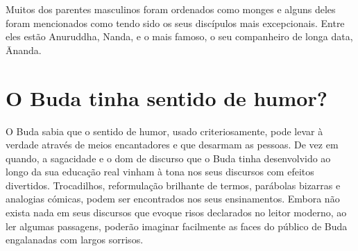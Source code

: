\enlargethispage{\baselineskip}

Muitos dos parentes masculinos foram ordenados como monges e alguns
deles foram mencionados como tendo sido os seus discípulos mais
excepcionais. Entre eles estão Anuruddha, Nanda, e o mais famoso, o seu
companheiro de longa data, Ānanda.

\section{O Buda tinha sentido de humor?}

O Buda sabia que o sentido de humor, usado criteriosamente, pode levar à
verdade através de meios encantadores e que desarmam as pessoas. De vez
em quando, a sagacidade e o dom de discurso que o Buda tinha
desenvolvido ao longo da sua educação real vinham à tona nos seus
discursos com efeitos divertidos. Trocadilhos, reformulação brilhante de
termos, parábolas bizarras e analogias cómicas, podem ser encontrados
nos seus ensinamentos. Embora não exista nada em seus discursos que
evoque risos declarados no leitor moderno, ao ler algumas passagens,
poderão imaginar facilmente as faces do público de Buda engalanadas com
largos sorrisos.
